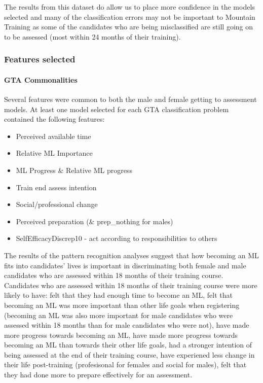 \documentclass[a4paper,]{book}
\providecommand{\tightlist}{%
  \setlength{\itemsep}{0pt}\setlength{\parskip}{0pt}}
\let\oldparagraph\paragraph
\renewcommand{\paragraph}[1]{\oldparagraph{#1}\mbox{}}
\begin{document}
The results from this dataset do allow us to place more confidence in the models selected and many of the classification errors may not be important to Mountain Training as some of the candidates who are being misclassified are still going on to be assessed (most within 24 months of their training).

\hypertarget{features-selected}{%
\subsubsection{Features selected}\label{features-selected}}

\hypertarget{gta-commonalities}{%
\paragraph{GTA Commonalities}\label{gta-commonalities}}

Several features were common to both the male and female getting to assessment models. At least one model selected for each GTA classification problem contained the following features:

\begin{itemize}
\tightlist
\item
  Perceived available time
\item
  Relative ML Importance
\item
  ML Progress \& Relative ML progress
\item
  Train end assess intention
\item
  Social/professional change
\item
  Perceived preparation (\& prep\_nothing for males)
\item
  SelfEfficacyDiscrep10 - act according to responsibilities to others
\end{itemize}

The results of the pattern recognition analyses suggest that how becoming an ML fits into candidates' lives is important in discriminating both female and male candidates who are assessed within 18 months of their training course. Candidates who are assessed within 18 months of their training course were more likely to have: felt that they had enough time to become an ML, felt that becoming an ML was more important than other life goals when registering (becoming an ML was also more important for male candidates who were assessed within 18 months than for male candidates who were not), have made more progress towards becoming an ML, have made more progress towards becoming an ML than towards their other life goals, had a stronger intention of being assessed at the end of their training course, have experiened less change in their life post-training (profesisonal for females and social for males), felt that they had done more to prepare effectively for an assessment.
\end{document}
